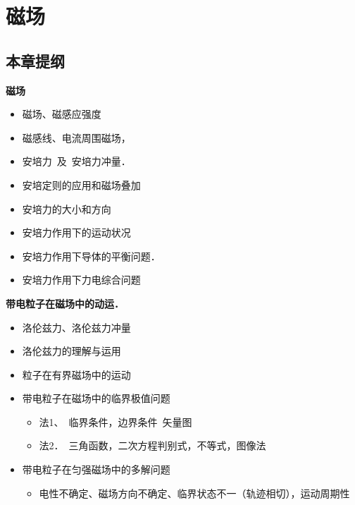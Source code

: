 \chapter{磁场}
\label{ch:11}

\section{本章提纲}
\textbf{磁场}
\begin{itemize}
\item 磁场、磁感应强度
\item 磁感线、电流周围磁场，
\item 安培力\ 及\ 安培力冲量．
\item 安培定则的应用和磁场叠加
\item 安培力的大小和方向
\item 安培力作用下的运动状况
\item 安培力作用下导体的平衡问题．
\item 安培力作用下力电综合问题
\end{itemize}

\textbf{带电粒子在磁场中的动运．}
\begin{itemize}
\item 洛伦兹力、洛伦兹力冲量
\item 洛伦兹力的理解与运用
\item 粒子在有界磁场中的运动
\item 带电粒子在磁场中的临界极值问题
  \begin{itemize}
  \item 法1、\ 临界条件，边界条件\ 矢量图
  \item 法2．\ 三角函数，二次方程判别式，不等式，图像法
  \end{itemize}
\item 带电粒子在匀强磁场中的多解问题
  \begin{itemize}
  \item 电性不确定、磁场方向不确定、临界状态不一（轨迹相切），运动周期性
  \end{itemize}
\end{itemize}

